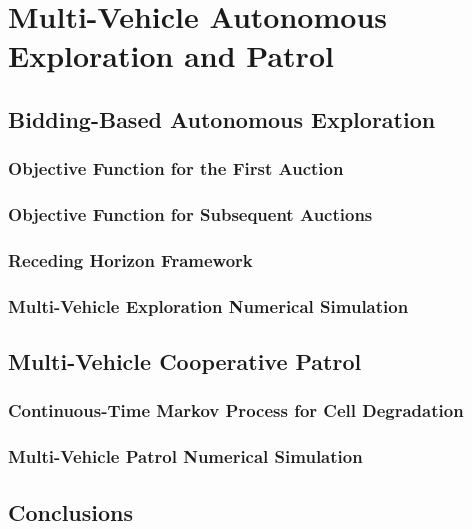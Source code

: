 
\chapter{Multi-Vehicle Autonomous Exploration and Patrol} \label{chap:multivehicle}

\section{Bidding-Based Autonomous Exploration}

\subsection{Objective Function for the First Auction}

\subsection{Objective Function for Subsequent Auctions}

\subsection{Receding Horizon Framework}

\subsection{Multi-Vehicle Exploration Numerical Simulation}

\section{Multi-Vehicle Cooperative Patrol}

\subsection{Continuous-Time Markov Process for Cell Degradation}

\subsection{Multi-Vehicle Patrol Numerical Simulation}

\section{Conclusions}





